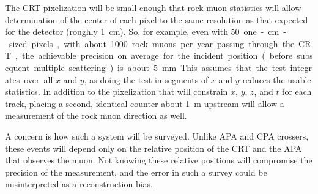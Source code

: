 The CRT %
pixelization will be small enough that rock-muon statistics will allow %
determination of the center of each pixel to %
the same resolution as that expected for the detector %
(roughly \SI{1}{\cm}). So, for example, even with \SI{50} one-\si{\cm}-sized pixels, %
with about \num{1000} rock muons per year passing through the CRT, the achievable precision %
on average %
for the incident position (before subsequent multiple scattering) is about \SI{5}{\milli\m}.  This assumes that the test integrates over all $x$ and $y$, as doing the test in segments of
$x$ and $y$ reduces the usable statistics. %
In addition to the pixelization that will constrain $x$, $y$, $z$, and
$t$ for each track, placing a second, identical counter about \SI{1}{\m} upstream will allow
a measurement of the rock muon direction as well.


A concern is how such a system will be surveyed. Unlike APA and CPA crossers, these events will depend only on the relative position of the CRT and the APA that observes the muon.  Not knowing these relative positions will compromise the precision of the measurement, and the error in such a survey could be misinterpreted as a reconstruction bias.

